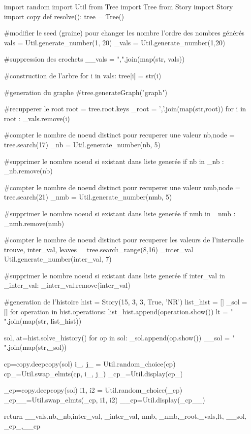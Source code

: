 \documentclass[12pt,a4paper]{article}
\begin{document}
\begin{pycode}

import random
import Util
from Tree import Tree
from Story import Story
import copy
def resolve():
	tree = Tree()
	
	#modifier le seed (graine) pour changer les nombre l'ordre des nombres générés
	vals = Util.generate_number(1, 20)
	_vals = Util.generate_number(1,20)
	
	#suppression des crochets
	__vals = ",".join(map(str, vals))
	
	
	#construction de l'arbre
	for i in vals:
		tree[i] = str(i)
		
	#generation du graphe
	#tree.generateGraph("graph")
	
	
	#recupperer le root
	root = tree.root.keys
	_root = ','.join(map(str,root))
	for i in root :
		_vals.remove(i)
	
	#compter le nombre de noeud distinct pour recuperer une valeur
	nb,node = tree.search(17)
	_nb = Util.generate_number(nb, 5)
	
	#supprimer le nombre noeud si existant dans liste generée
	if nb in _nb :
		_nb.remove(nb)
		
		
	#compter le nombre de noeud distinct pour recuperer une valeur
	nmb,node = tree.search(21)
	_nmb = Util.generate_number(nmb, 5)
	
	#supprimer le nombre noeud si existant dans liste generée
	if nmb in _nmb :
		_nmb.remove(nmb)
		
	#compter le nombre de noeud distinct pour recuperer les valeurs de l'intervalle
	trouve, inter_val, leaves = tree.search_range(8,16)
	_inter_val = Util.generate_number(inter_val, 7)
	
	#supprimer le nombre noeud si existant dans liste generée
	if inter_val in _inter_val:
		_inter_val.remove(inter_val)
	
	#generation de l'histoire
	hist = Story(15, 3, 3, True, 'NR')
	list_hist = []
	_sol = []
	for operation in hist.operations:
		list_hist.append(operation.show())
	lt = " ".join(map(str, list_hist))
	
	sol, at=hist.solve_history()
	for op in sol:
		_sol.append(op.show())
	__sol = " ".join(map(str,_sol))
	
	
	cp=copy.deepcopy(sol)
	i_, j_ = Util.random_choice(cp)
	cp_=Util.swap_elmts(cp, i_, j_)
	_cp_=Util.display(cp_)
	
	_cp=copy.deepcopy(sol)
	i1, i2 = Util.random_choice(_cp)
	_cp__=Util.swap_elmts(_cp, i1, i2)
	__cp=Util.display(_cp__)

	return __vals,nb,_nb,inter_val, _inter_val, nmb, _nmb,_root,_vals,lt, __sol, _cp_,__cp
	

\end{pycode}
\end{document}
